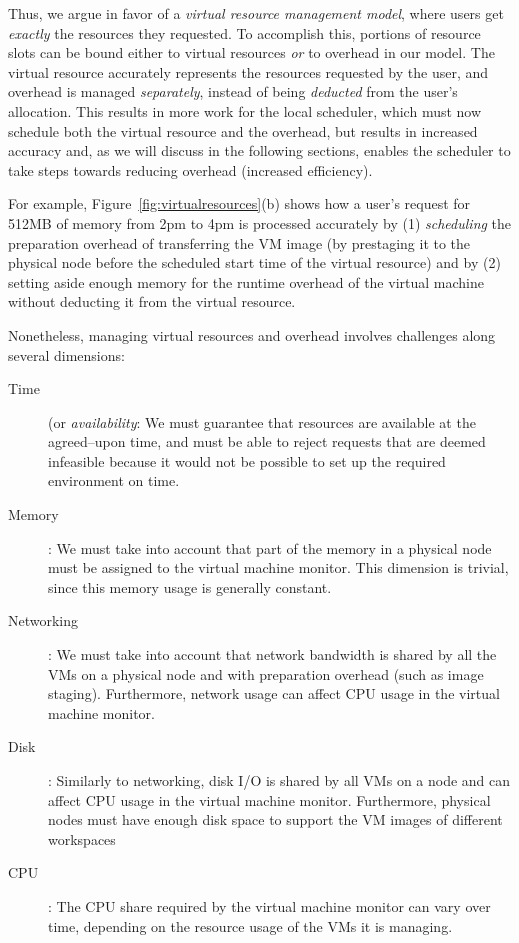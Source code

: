 \documentclass[singlespace]{ccw_chithesis}
\begin{document}
Thus, we argue in favor of a \emph{virtual resource management model}, where users get \emph{exactly} the resources they requested. To accomplish this, portions of resource slots can be bound either to virtual resources \emph{or}
to overhead in our model. The virtual resource accurately represents the resources requested by the user, and overhead is managed \emph{separately}, instead of being \emph{deducted} from the user's allocation. This results in more work for the local scheduler, which must now schedule both the virtual resource and the overhead, but results in increased accuracy and, as we will discuss in the following sections, enables the scheduler to take steps towards reducing overhead (increased efficiency).

For example, Figure~\ref{fig:virtualresources}(b) shows how a user's request for 512MB of memory from 2pm to 4pm is processed accurately by (1) \emph{scheduling} the preparation overhead of transferring the VM image (by prestaging it to the physical node before the scheduled start time of the virtual resource) and by (2) setting aside enough memory for the runtime overhead of the virtual machine without deducting it from the virtual resource.

Nonetheless, managing virtual resources and overhead involves challenges along several dimensions:

\begin{description}
\item[Time] (or \emph{availability}: We must guarantee that resources are available at the agreed--upon time, and must be able to reject requests that are deemed infeasible because it would not be possible to set up the required environment on time.
\item[Memory]: We must take into account that part of the memory in a physical node must be assigned to the virtual machine monitor. This dimension is trivial, since this memory usage is generally constant.
\item[Networking]: We must take into account that network bandwidth is shared by all the VMs on a physical node and with preparation overhead (such as image staging). Furthermore, network usage can affect CPU usage in the virtual machine monitor.
\item[Disk]: Similarly to networking, disk I/O is shared by all VMs on a node and can affect CPU usage in the virtual machine monitor. Furthermore, physical nodes must have enough disk space to support the VM images of different workspaces
\item[CPU]: The CPU share required by the virtual machine monitor can vary over time, depending on the resource usage of the VMs it is managing.
\end{description}
\end{document}
